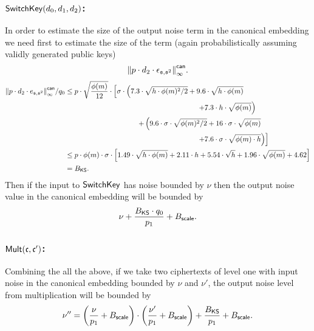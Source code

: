 \subsubsection{$\mathsf{SwitchKey}(d_0,d_1,d_2)$:}
In order to estimate the size of the output noise term 
in the canonical embedding we need first to estimate the size of the term
(again probabilistically assuming validly generated public
keys)
\[ {\Vert p \cdot d_2 \cdot \epsilon_{\mathfrak{s},\mathfrak{s}^2} \Vert}_\infty^{\mathsf{can}}. \]
\begin{align*}
 \norm{ p \cdot d_2 \cdot e_{\sk,\sk^2}}_\infty^\can /q_0
     &\le p \cdot \sqrt{\frac{\phi(m)}{12}} \cdot
          \left[ \sigma \cdot \left(
                        7.3 \cdot \sqrt{h \cdot \phi(m)^2/2}  %
	              + 9.6 \cdot \sqrt{h \cdot \phi(m)}              %
			\right. \right. \\
                &~~~~~~~~~~~~~~~~~~~~~~~~~~~~~~~~~~~~~~~~~~~~~~~~~~~~~~~ \left. \left.
                      + 7.3 \cdot h \cdot \sqrt{\phi(m)}      %
			   \right) \right.  \\
		&~~~~~~~~~~~~~~~~~~~~~~~~~~~~~~\left. + \left(
			9.6 \cdot \sigma \cdot \sqrt{\phi(m)^2/2}          %
                      + 16  \cdot \sigma \cdot \sqrt{\phi(m)}                      %
			\right. \right. \\
                & ~~~~~~~~~~~~~~~~~~~~~~~~~~~~~~~~~~~~~~~~~~~~~~~~~~~~~~~ \left. \left.
                      + 7.6 \cdot \sigma \cdot \sqrt{\phi(m) \cdot h}      %
			  \right)  \right] \\
     &\le  p \cdot \phi(m) \cdot \sigma  \cdot
          \left[              1.49 \cdot \sqrt{h \cdot \phi(m)} + 2.11 \cdot h + 5.54 \cdot \sqrt{h} 
			   +  1.96 \cdot \sqrt{\phi(m)}  
                      + 4.62 
	  \right] \\
     & = B_\KS.
\end{align*}
Then if the input to $\mathsf{SwitchKey}$ has noise bounded by $\nu$ then the output 
noise value in the canonical embedding will be bounded by
\[ \nu+\frac{B_{\mathsf{KS}} \cdot q_0}{p_1} + B_{\mathsf{scale}}. \]


\subsubsection{$\mathsf{Mult}(\mathfrak{c},\mathfrak{c}')$:}
Combining the all the above, if we take two ciphertexts of level one
with input noise in the canonical embedding bounded by $\nu$ and $\nu'$, the output noise level 
from multiplication will be bounded by
\[ \nu'' =      \left( \frac{\nu}{p_1} + B_{\mathsf{scale}} \right)
	  \cdot 
                \left( \frac{\nu'}{p_1} + B_{\mathsf{scale}} \right)
		+ \frac{B_{\mathsf{KS}}}{p_1}+B_{\mathsf{scale}}.
\]

